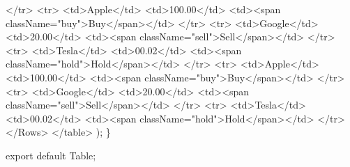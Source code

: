 \documentclass[11pt]{article}
\begin{document}
            </tr>
            <tr>
              <td>Apple</td>
              <td>100.00</td>
              <td><span className="buy">Buy</span></td>
            </tr>
            <tr>
              <td>Google</td>
              <td>20.00</td>
              <td><span className="sell">Sell</span></td>
            </tr>
            <tr>
              <td>Tesla</td>
              <td>00.02</td>
              <td><span className="hold">Hold</span></td>
            </tr>
            <tr>
              <td>Apple</td>
              <td>100.00</td>
              <td><span className="buy">Buy</span></td>
            </tr>
            <tr>
              <td>Google</td>
              <td>20.00</td>
              <td><span className="sell">Sell</span></td>
            </tr>
            <tr>
              <td>Tesla</td>
              <td>00.02</td>
              <td><span className="hold">Hold</span></td>
            </tr>
	  </Rows>
          </table>
  );
\}

export default Table;
\end{document}
